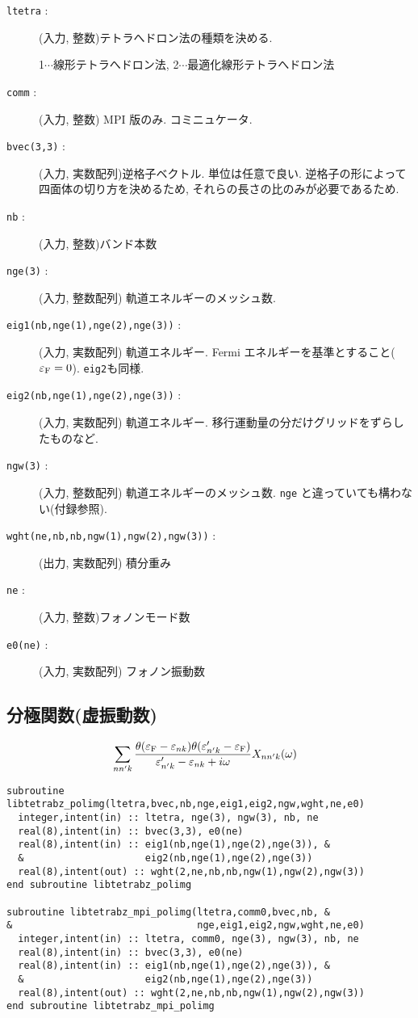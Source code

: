 \documentclass[12pt]{jarticle}
\begin{document}
\begin{description}
\item[\texttt{ltetra} : ] (入力, 整数)テトラへドロン法の種類を決める. 
  
  1$\cdots$線形テトラへドロン法,
  2$\cdots$最適化線形テトラへドロン法
\item[\texttt{comm} : ] (入力, 整数) MPI 版のみ. コミニュケータ. 
\item[\texttt{bvec(3,3)} : ] (入力, 実数配列)逆格子ベクトル. 単位は任意で良い. 
  逆格子の形によって四面体の切り方を決めるため, それらの長さの比のみが必要であるため. 
\item[\texttt{nb} : ] (入力, 整数)バンド本数
\item[\texttt{nge(3)} : ] (入力, 整数配列) 軌道エネルギーのメッシュ数. 
\item[\texttt{eig1(nb,nge(1),nge(2),nge(3))} : ] (入力, 実数配列) 軌道エネルギー. 
  Fermi エネルギーを基準とすること($\varepsilon_{\rm F} = 0$). \verb|eig2|も同様. 
\item[\texttt{eig2(nb,nge(1),nge(2),nge(3))} : ] (入力, 実数配列) 軌道エネルギー. 
  移行運動量の分だけグリッドをずらしたものなど. 
\item[\texttt{ngw(3)} : ] (入力, 整数配列) 軌道エネルギーのメッシュ数. 
\verb|nge| と違っていても構わない(付録参照). 
\item[\texttt{wght(ne,nb,nb,ngw(1),ngw(2),ngw(3))} : ] (出力, 実数配列) 積分重み
\item[\texttt{ne} : ] (入力, 整数)フォノンモード数
\item[\texttt{e0(ne)} : ] (入力, 実数配列) フォノン振動数
\end{description}

\newpage

\subsection{分極関数(虚振動数)}

\begin{align}
&\sum_{n n' k} \frac{\theta(\varepsilon_{\rm F} - \varepsilon_{n k})
  \theta(\varepsilon'_{n' k} - \varepsilon_{\rm F})}
    {\varepsilon'_{n' k} - \varepsilon_{n k} + i \omega} X_{n n' k}(\omega)
\end{align}

\begin{verbatim}
subroutine libtetrabz_polimg(ltetra,bvec,nb,nge,eig1,eig2,ngw,wght,ne,e0)
  integer,intent(in) :: ltetra, nge(3), ngw(3), nb, ne
  real(8),intent(in) :: bvec(3,3), e0(ne)
  real(8),intent(in) :: eig1(nb,nge(1),nge(2),nge(3)), &
  &                     eig2(nb,nge(1),nge(2),nge(3))
  real(8),intent(out) :: wght(2,ne,nb,nb,ngw(1),ngw(2),ngw(3))
end subroutine libtetrabz_polimg

subroutine libtetrabz_mpi_polimg(ltetra,comm0,bvec,nb, &
&                                nge,eig1,eig2,ngw,wght,ne,e0)
  integer,intent(in) :: ltetra, comm0, nge(3), ngw(3), nb, ne
  real(8),intent(in) :: bvec(3,3), e0(ne)
  real(8),intent(in) :: eig1(nb,nge(1),nge(2),nge(3)), &
  &                     eig2(nb,nge(1),nge(2),nge(3))
  real(8),intent(out) :: wght(2,ne,nb,nb,ngw(1),ngw(2),ngw(3))
end subroutine libtetrabz_mpi_polimg
\end{verbatim}
\end{document}
